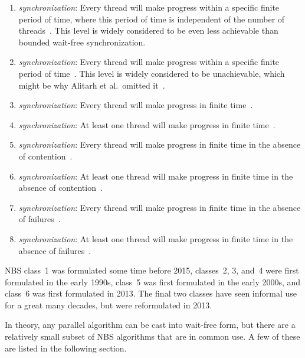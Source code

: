 \begin{enumerate}
\item	\emph{ synchronization}:
	Every thread will make progress within a specific finite period
	of time, where this period of time is independent of the number
	of threads~\cite{HerlihyShavit2008Textbook}.
	This level is widely considered to be even less achievable than
	bounded wait-free synchronization.
\item	\emph{ synchronization}:
	Every thread will make progress within
	a specific finite period of time~\cite{Herlihy91}.
	This level is widely considered to be unachievable, which might be why
	Alitarh et al.\ omitted it~\cite{DanAlitarh2013PracticalProgress}.
\item	\emph{ synchronization}:
	Every thread will make progress
	in finite time~\cite{Herlihy93}.
\item	\emph{ synchronization}:
	At least one thread will
	make progress in finite time~\cite{Herlihy93}.
\item	\emph{ synchronization}:
	Every thread will make progress in finite time in the absence of
	contention~\cite{HerlihyLM03}.
\item	\emph{ synchronization}:
	At least one thread will make progress in finite time in the absence of
	contention~\cite{DanAlitarh2013PracticalProgress}.
\item	\emph{ synchronization}:
	Every thread will make progress in finite time in the absence of
	failures~\cite{DanAlitarh2013PracticalProgress}.
\item	\emph{ synchronization}:
	At least one thread will make progress in finite time in the absence of
	failures~\cite{DanAlitarh2013PracticalProgress}.
\end{enumerate}


NBS class~1 was formulated some time before 2015,
classes~2, 3, and~4 were first formulated in the early 1990s,
class~5 was first formulated in the early 2000s,
and class~6 was first formulated in 2013.
The final two classes have seen informal use for a great many decades,
but were reformulated in 2013.

In theory, any parallel algorithm can be cast into wait-free form,
but there are a relatively small subset of NBS algorithms that are
in common use.
A few of these are listed in the following section.

